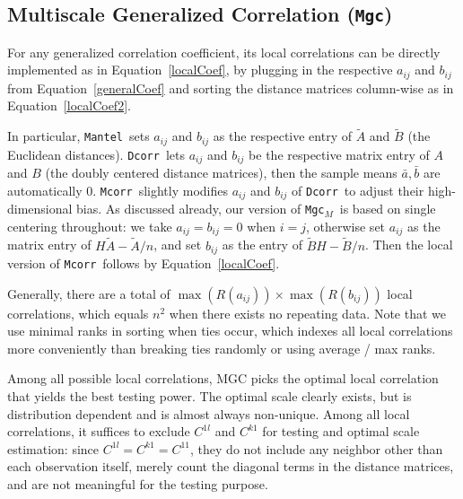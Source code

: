 \documentclass[11pt]{article}
\providecommand{\sct}[1]{{\sc \texttt{#1}}}
\newcommand{\G}{C}
\newcommand{\Mgc}{\sct{Mgc}}
\newcommand{\Mgcm}{\sct{Mgc$_M$}}
\newcommand{\Dcorr}{\sct{Dcorr}}
\newcommand{\Mcorr}{\sct{Mcorr}}
\newcommand{\Mantel}{\sct{Mantel}}
\begin{document}
\subsection{Multiscale Generalized Correlation (\Mgc)}
\label{appen:mgc}
For any generalized correlation coefficient, its local correlations can be directly implemented as in Equation~\ref{localCoef}, by plugging in the respective $a_{ij}$ and $b_{ij}$ from Equation~\ref{generalCoef} and sorting the distance matrices column-wise as in Equation~\ref{localCoef2}.

In particular, \Mantel~sets $a_{ij}$ and $b_{ij}$ as the respective entry of $\tilde{A}$ and $\tilde{B}$ (the Euclidean distances). \Dcorr~lets $a_{ij}$ and $b_{ij}$ be the respective matrix entry of $A$ and $B$ (the doubly centered distance matrices), then the sample means $\bar{a}, \bar{b}$ are automatically $0$. \Mcorr~slightly modifies $a_{ij}$ and $b_{ij}$ of \Dcorr~to adjust their high-dimensional bias. As discussed already, our version of \Mgcm~is based on single centering throughout: we take $a_{ij}=b_{ij}=0$ when $i=j$, otherwise set $a_{ij}$ as the matrix entry of $H\tilde{A}-\tilde{A}/n$, and set $b_{ij}$ as the entry of $\tilde{B}H-\tilde{B}/n$. Then the local version of \Mcorr~follows by Equation~\ref{localCoef}.

Generally, there are a total of $\max(R(a_{ij})) \times \max(R(b_{ij}))$ local correlations, which equals $n^2$ when there exists no repeating data. Note that we use minimal ranks in sorting when ties occur, which indexes all local correlations more conveniently than breaking ties randomly or using average / max ranks.

Among all possible local correlations, MGC picks the optimal local correlation that yields the best testing power. The optimal scale clearly exists, but is distribution dependent and is almost always non-unique. Among all local correlations, it suffices to exclude $\G^{1l}$ and $\G^{k1}$ for testing and optimal scale estimation: since $\G^{1l}=\G^{k1}=\G^{11}$, they do not include any neighbor other than each observation itself, merely count the diagonal terms in the distance matrices, and are not meaningful for the testing purpose.

\end{document}
